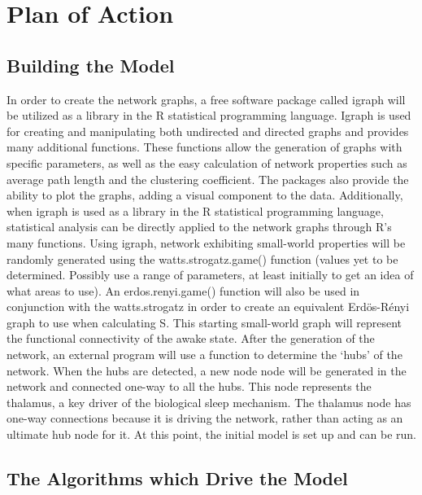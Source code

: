\documentclass[12pt,letterpaper]{report}
\begin{document}
\chapter{Plan of Action}
\section{Building the Model}
	In order to create the network graphs, a free software package called igraph will be utilized as a library in the R statistical programming language. Igraph is used for creating and manipulating both undirected and directed graphs and provides many additional functions. These functions allow the generation of graphs with specific parameters, as well as the easy calculation of network properties such as average path length and the clustering coefficient. The packages also provide the ability to plot the graphs, adding a visual component to the data. Additionally, when igraph is used as a library in the R statistical programming language, statistical analysis can be directly applied to the network graphs through R’s many functions. 
	Using igraph, network exhibiting small-world properties will be randomly generated using the watts.strogatz.game() function (values yet to be determined. Possibly use a range of parameters, at least initially to get an idea of what areas to use). An erdos.renyi.game() function will also be used in conjunction with the watts.strogatz in order to create an equivalent Erdös-Rényi graph to use when calculating S. This starting small-world graph will represent the functional connectivity of the awake state. After the generation of the network, an external program will use a function to determine the ‘hubs’ of the network. When the hubs are detected, a new node node will be generated in the network and connected one-way to all the hubs. This node represents the thalamus, a key driver of the biological sleep mechanism. The thalamus node has one-way connections because it is driving the network, rather than acting as an ultimate hub node for it. At this point, the initial model is set up and can be run.
\section{The Algorithms which Drive the Model}
\end{document}
